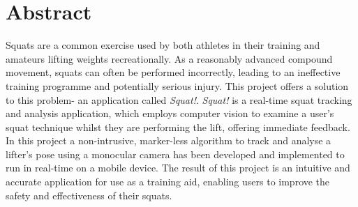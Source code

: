 \vspace*{4cm}
\section*{Abstract}

Squats are a common exercise used by both athletes in their training and amateurs lifting weights recreationally. As a reasonably advanced compound movement, squats can often be performed incorrectly, leading to an ineffective training programme and potentially serious injury. This project offers a solution to this problem- an application called \emph{Squat!}. \emph{Squat!} is a real-time squat tracking and analysis application, which employs computer vision to examine a user's squat technique whilst they are performing the lift, offering immediate feedback. In this project a non-intrusive, marker-less algorithm to track and analyse a lifter's pose using a monocular camera has been developed and implemented to run in real-time on a mobile device. The result of this project is an intuitive and accurate application for use as a training aid, enabling users to improve the safety and effectiveness of their squats.
